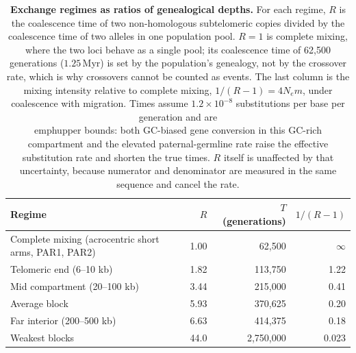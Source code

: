 
\begin{table}[h!]
\centering
\caption{\textbf{Exchange regimes as ratios of genealogical depths.} For each regime, $R$ is the
coalescence time of two non-homologous subtelomeric copies divided by the coalescence time of two
alleles in one population pool. $R = 1$ is complete mixing, where the two
loci behave as a single pool; its coalescence time of 62,500 generations ($1.25$\,Myr) is set
by the population's genealogy, not by the crossover rate, which is why crossovers cannot be counted as
events. The last column is the mixing intensity relative to complete mixing,
$1/(R-1) = 4N_e m$, under coalescence with migration. Times assume $1.2\times10^{-8}$ substitutions per
base per generation and are \\emph{upper bounds}: both GC-biased gene conversion in this GC-rich
compartment and the elevated paternal-germline rate raise the effective substitution rate and shorten
the true times. $R$ itself is unaffected by that uncertainty, because numerator and denominator are
measured in the same sequence and cancel the rate.}
\label{tab:exchange_regimes}
\small
\begin{tabular}{lrrr}
\hline
Regime & $R$ & $T$ (generations) & $1/(R-1)$ \\
\hline
Complete mixing (acrocentric short arms, PAR1, PAR2) & 1.00 & 62,500 & $\infty$ \\
Telomeric end (6--10 kb) & 1.82 & 113,750 & 1.22 \\
Mid compartment (20--100 kb) & 3.44 & 215,000 & 0.41 \\
Average block & 5.93 & 370,625 & 0.20 \\
Far interior (200--500 kb) & 6.63 & 414,375 & 0.18 \\
Weakest blocks & 44.0 & 2,750,000 & 0.023 \\
\hline
\end{tabular}
\end{table}

